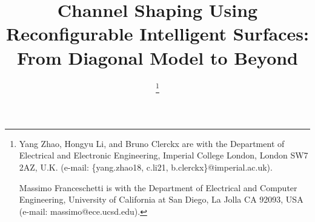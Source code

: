 \documentclass[journal]{IEEEtran}
\begin{document}
\title{Channel Shaping Using Reconfigurable Intelligent Surfaces: From Diagonal Model to Beyond}
\author{
	\thanks{
		Yang Zhao, Hongyu Li, and Bruno Clerckx are with the Department of Electrical and Electronic Engineering, Imperial College London, London SW7 2AZ, U.K. (e-mail: \{yang.zhao18, c.li21, b.clerckx\}@imperial.ac.uk).

		Massimo Franceschetti is with the Department of Electrical and Computer Engineering, University of California at San Diego, La Jolla CA 92093, USA (e-mail: massimo@ece.ucsd.edu).
	}
}
\maketitle
\end{document}
